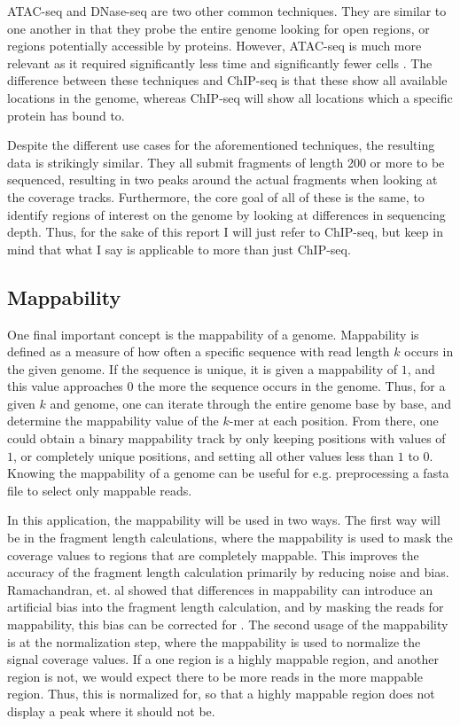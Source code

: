 \documentclass[a4paper]{article}
\begin{document}
    ATAC-seq and DNase-seq are two other common techniques. They are similar to one another in that they probe the entire
    genome looking for open regions, or regions potentially accessible by proteins. However, ATAC-seq is much more relevant
    as it required significantly less time and significantly fewer cells \cite{buenrostro_transposition_2013}. The difference between these techniques
    and ChIP-seq is that these show all available locations in the genome, whereas ChIP-seq will show all locations which
    a specific protein has bound to.

    Despite the different use cases for the aforementioned techniques, the resulting data is strikingly similar.
    They all submit fragments of length 200 or more to be sequenced, resulting in two peaks around the actual fragments
    when looking at the coverage tracks. Furthermore, the core goal of all of these is the same, to identify regions
    of interest on the genome by looking at differences in sequencing depth. Thus, for the sake of this report I will just
    refer to ChIP-seq, but keep in mind that what I say is applicable to more than just ChIP-seq.

    \subsection{Mappability}
    One final important concept is the mappability of a genome. Mappability is defined as a measure of how often a
    specific sequence with read length $k$ occurs in the given genome. If the sequence is unique, it is given a mappability
    of $1$, and this value approaches $0$ the more the sequence occurs in the genome. Thus, for a given $k$ and genome,
    one can iterate through the entire genome base by base, and determine the mappability value of the $k$-mer at each
    position. From there, one could obtain a binary mappability track by only keeping positions with values of $1$, or
    completely unique positions, and setting all other values less than $1$ to $0$. Knowing the mappability of a genome
    can be useful for e.g. preprocessing a fasta file to select only mappable reads.

    In this application, the mappability will be used in two ways. The first way will be in the fragment length calculations,
    where the mappability is used to mask the coverage values to regions that are completely mappable. This improves
    the accuracy of the fragment length calculation primarily by reducing noise and bias. Ramachandran, et. al showed
    that differences in mappability can introduce an artificial bias into the fragment length calculation, and by masking
    the reads for mappability, this bias can be corrected for \cite{ramachandran_masc:_2013}. The second usage of the mappability is at the
    normalization step, where the mappability is used to normalize the signal coverage values. If a one region is a
    highly mappable region, and another region is not, we would expect there to be more reads in the more mappable region.
    Thus, this is normalized for, so that a highly mappable region does not display a peak where it should not be.
\end{document}
